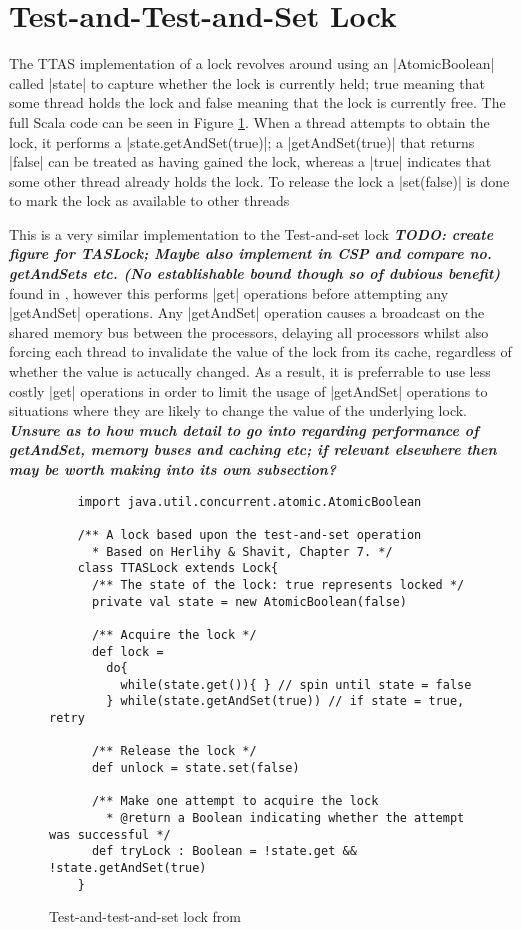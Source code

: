 \section{Test-and-Test-and-Set Lock}

The TTAS implementation of a lock revolves around using an |AtomicBoolean| called |state| to capture whether the lock is currently held; true meaning that some thread holds the lock and false meaning that the lock is currently free. The full Scala code can be seen in Figure \ref{fig:TTASScala}. When a thread attempts to obtain the lock, it performs a |state.getAndSet(true)|; a |getAndSet(true)| that returns |false| can be treated as having gained the lock, whereas a |true| indicates that some other thread already holds the lock. To release the lock a |set(false)| is done to mark the lock as available to other threads

This is a very similar implementation to the Test-and-set lock \textbf{\emph{TODO: create figure for TASLock; Maybe also implement in CSP and compare no. getAndSets etc. (No establishable bound though so of dubious benefit)}} found in \cite{TAoMP}, however this performs |get| operations before attempting any |getAndSet| operations. Any |getAndSet| operation causes a broadcast on the shared memory bus between the processors, delaying all processors whilst also forcing each thread to invalidate the value of the lock from its cache, regardless of whether the value is actucally changed. As a result, it is preferrable to use less costly |get| operations in order to limit the usage of |getAndSet| operations to situations where they are likely to change the value of the underlying lock. \textbf{\emph{Unsure as to how much detail to go into regarding performance of getAndSet, memory buses and caching etc; if relevant elsewhere then may be worth making into its own subsection?}}

\begin{figure}
  \begin{lstlisting}
    import java.util.concurrent.atomic.AtomicBoolean

    /** A lock based upon the test-and-set operation 
      * Based on Herlihy & Shavit, Chapter 7. */
    class TTASLock extends Lock{
      /** The state of the lock: true represents locked */
      private val state = new AtomicBoolean(false)

      /** Acquire the lock */
      def lock = 
        do{
          while(state.get()){ } // spin until state = false
        } while(state.getAndSet(true)) // if state = true, retry

      /** Release the lock */
      def unlock = state.set(false)

      /** Make one attempt to acquire the lock
        * @return a Boolean indicating whether the attempt was successful */
      def tryLock : Boolean = !state.get && !state.getAndSet(true)
    }

  \end{lstlisting}
  \caption{Test-and-test-and-set lock from \cite{TAoMP}  \label{fig:TTASScala}}
\end{figure}

